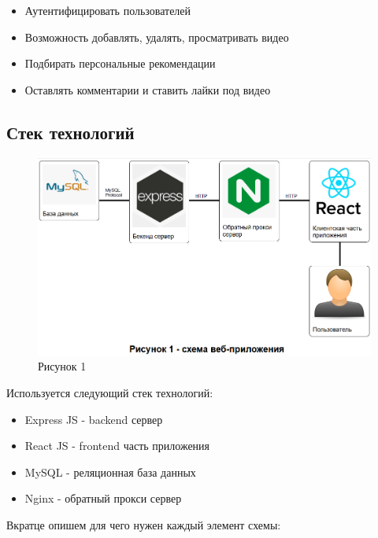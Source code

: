 \documentclass[12pt]{article}
\begin{document}
\begin{itemize}
    \item Аутентифицировать пользователей
    \item Возможность добавлять, удалять, просматривать видео
    \item Подбирать персональные рекомендации
    \item Оставлять комментарии и ставить лайки под видео
\end{itemize}

\subsection{Стек технологий}

\begin{figure}[H]
    \centering
    \includegraphics[width=1\textwidth]{../images/Схема_веб-приложения.png}
    \caption{Рисунок 1}
\end{figure}

Используется следующий стек технологий:

\begin{itemize}
    \item Express JS - backend сервер
    \item React JS - frontend часть приложения
    \item MySQL - реляционная база данных
    \item Nginx - обратный прокси сервер
\end{itemize}

Вкратце опишем для чего нужен каждый элемент схемы:
\end{document}
